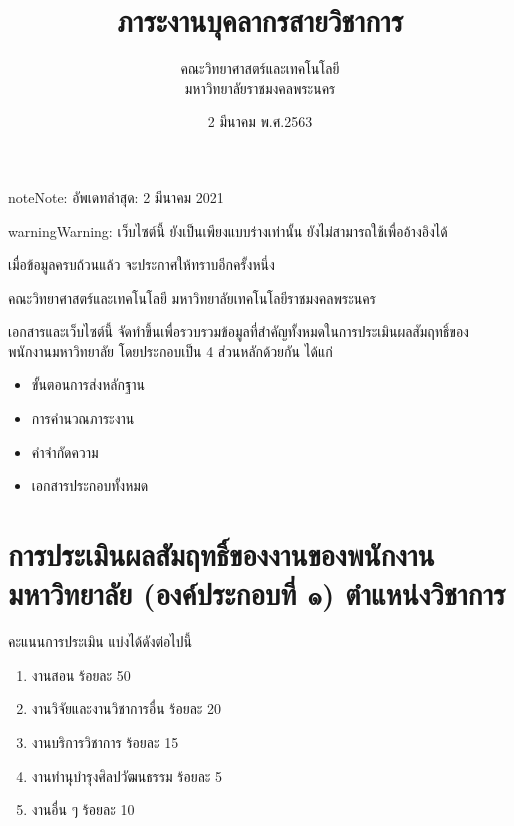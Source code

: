 \documentclass[a4paper,12pt,english]{sphinxmanual}
\title{ภาระงานบุคลากรสายวิชาการ}
\date{2 มีนาคม พ.ศ.2563}
\author{คณะวิทยาศาสตร์และเทคโนโลยี \\ มหาวิทยาลัยราชมงคลพระนคร}
\begin{document}
\pagestyle{empty}
\sphinxmaketitle
\pagestyle{plain}
\sphinxtableofcontents
\pagestyle{normal}
\label{\detokenize{index::doc}}
\begin{sphinxadmonition}{note}{Note:}
อัพเดทล่าสุด: 2 มีนาคม 2021
\end{sphinxadmonition}

\begin{sphinxadmonition}{warning}{Warning:}
เว็บไซต์นี้ ยังเป็นเพียงแบบร่างเท่านั้น ยังไม่สามารถใช้เพื่ออ้างอิงได้

เมื่อข้อมูลครบถ้วนแล้ว จะประกาศให้ทราบอีกครั้งหนึ่ง
\end{sphinxadmonition}



คณะวิทยาศาสตร์และเทคโนโลยี มหาวิทยาลัยเทคโนโลยีราชมงคลพระนคร

เอกสารและเว็บไซต์นี้ จัดทำขึ้นเพื่อรวบรวมข้อมูลที่สำคัญทั้งหมดในการประเมินผลสัมฤทธิ์ของพนักงานมหาวิทยาลัย โดยประกอบเป็น 4 ส่วนหลักด้วยกัน ได้แก่
\begin{itemize}
\item {} 
ขั้นตอนการส่งหลักฐาน

\item {} 
การคำนวณภาระงาน

\item {} 
คำจำกัดความ

\item {} 
เอกสารประกอบทั้งหมด

\end{itemize}


\chapter{การประเมินผลสัมฤทธิ์ของงานของพนักงานมหาวิทยาลัย (องค์ประกอบที่ ๑)  ตำแหน่งวิชาการ}
\label{\detokenize{submission_part1:id1}}\label{\detokenize{submission_part1::doc}}
คะแนนการประเมิน แบ่งได้ดังต่อไปนี้
\begin{enumerate}
%
\item {} 
งานสอน ร้อยละ 50

\item {} 
งานวิจัยและงานวิชาการอื่น ร้อยละ 20

\item {} 
งานบริการวิชาการ ร้อยละ 15

\item {} 
งานทำนุบำรุงศิลปวัฒนธรรม ร้อยละ 5

\item {} 
งานอื่น ๆ ร้อยละ 10

\end{enumerate}
\end{document}
